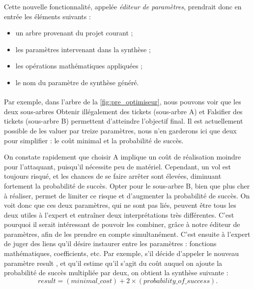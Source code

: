			Cette nouvelle fonctionnalité, appelée \emph{éditeur de paramètres}, prendrait donc en entrée les éléments suivants :
			\begin{itemize}
				\item un arbre provenant du projet courant ;
				\item les paramètres intervenant dans la synthèse ;
				\item les opérations mathématiques appliquées ;
				\item le nom du paramètre de synthèse généré.
			\end{itemize}

			\paragraph{}
			Par exemple, dans l'arbre de la  \ref{fig:pre_optimiseur}, nous pouvons voir que les deux sous-arbres \og Obtenir illégalement des tickets \fg{} (sous-arbre A) et \og Falsifier des tickets \fg{} (sous-arbre B) permettent d'atteindre l'objectif final. Il est actuellement possible de les valuer par treize paramètres, nous n'en garderons ici que deux pour simplifier : le coût minimal et la probabilité de succès.

			On constate rapidement que choisir A implique un coût de réalisation moindre pour l'attaquant, puisqu'il nécessite peu de matériel. Cependant, un vol est toujours risqué, et les chances de se faire arrêter sont élevées, diminuant fortement la probabilité de succès. Opter pour le sous-arbre B, bien que plus cher à réaliser, permet de limiter ce risque et d'augmenter la probabilité de succès. On voit donc que ces deux paramètres, qui ne sont pas liés, peuvent être tous les deux utiles à l'expert et entraîner deux interprétations très différentes. C'est pourquoi il serait intéressant de pouvoir les combiner, grâce à notre éditeur de paramètres, afin de les prendre en compte simultanément. C'est ensuite à l'expert de juger des liens qu'il désire instaurer entre les paramètres : fonctions mathématiques, coefficients, etc. Par exemple, s'il décide d'appeler le nouveau paramètre \og result \fg{}, et qu'il estime qu'il s'agit du coût auquel on ajoute la probabilité de succès multipliée par deux, on obtient la synthèse suivante : \[ result = (minimal\_cost) + 2 \times (probability\_of\_success).\]
